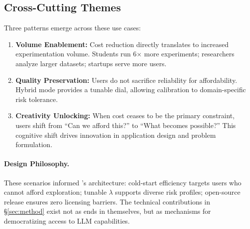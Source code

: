\subsection{Cross-Cutting Themes}

Three patterns emerge across these use cases:

\begin{enumerate}[leftmargin=*]
    \item \textbf{Volume Enablement:} Cost reduction directly translates to increased experimentation volume. Students run 6× more experiments; researchers analyze larger datasets; startups serve more users.
    \item \textbf{Quality Preservation:} Users do not sacrifice reliability for affordability. Hybrid mode provides a tunable dial, allowing calibration to domain-specific risk tolerance.
    \item \textbf{Creativity Unlocking:} When cost ceases to be the primary constraint, users shift from ``Can we afford this?'' to ``What becomes possible?'' This cognitive shift drives innovation in application design and problem formulation.
\end{enumerate}

\paragraph{Design Philosophy.} These scenarios informed \ours{}'s architecture: cold-start efficiency targets users who cannot afford exploration; tunable $\lambda$ supports diverse risk profiles; open-source release ensures zero licensing barriers. The technical contributions in \S\ref{sec:method} exist not as ends in themselves, but as mechanisms for democratizing access to LLM capabilities.

